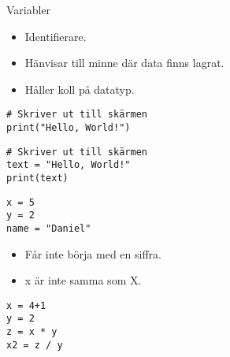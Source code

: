 \begin{frame}[fragile]
  \begin{block}{Variabler}
    \begin{itemize}
      \item Identifierare.
      \item Hänvisar till minne där data finns lagrat.
      \item Håller koll på datatyp.
    \end{itemize}
  \end{block}

  \pause

  \begin{example}
    \begin{verbatim}
# Skriver ut till skärmen
print("Hello, World!")
    \end{verbatim}
  \end{example}

  \begin{example}
    \begin{verbatim}
# Skriver ut till skärmen
text = "Hello, World!"
print(text)
    \end{verbatim}
  \end{example}
\end{frame}

\begin{frame}[fragile]
  \begin{example}[Variabler]
    \begin{verbatim}
x = 5
y = 2
name = "Daniel"
    \end{verbatim}
  \end{example}
\end{frame}

\begin{frame}
  \begin{remark}
    \begin{itemize}
      \item Får inte börja med en siffra.
      \item x är inte samma som X.
    \end{itemize}
  \end{remark}
\end{frame}

\begin{frame}[fragile]
  \begin{example}[Heltalsoperationer]
    \begin{verbatim}
x = 4+1
y = 2
z = x * y
x2 = z / y
    \end{verbatim}
  \end{example}
\end{frame}

